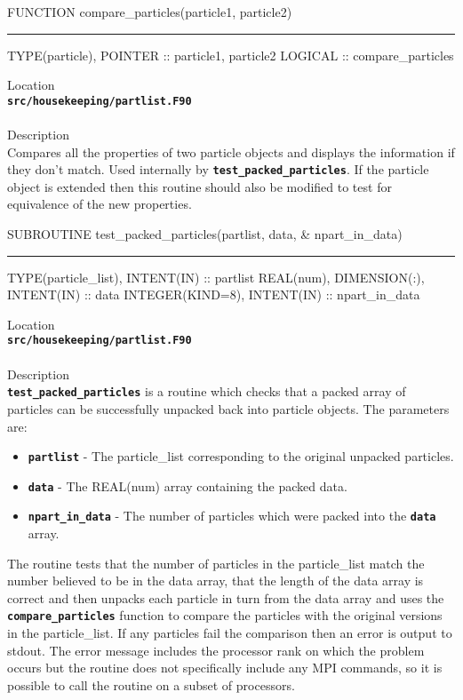 \documentclass[12pt,a4paper]{article}
\newcommand{\HRule}{\rule[0.3cm]{\linewidth}{0.5mm}}
\newcommand{\inlinecode}[1]{{\color{warwickred} \bf\texttt{#1}}}
\begin{document}
\begin{codedef}
FUNCTION compare_particles(particle1, particle2)
\HRule
TYPE(particle), POINTER :: particle1, particle2
LOGICAL :: compare_particles
\end{codedef}
\vspace{1cm}
{\Large Location\\}
\inlinecode{src/housekeeping/partlist.F90}\\
\\[0.5cm]
{\Large Description\\}
Compares all the properties of two particle objects and displays the
information if they don't match. Used internally by
\inlinecode{test\_packed\_particles}. If the particle object is extended then
this routine should also be modified to test for equivalence of the new
properties.
\\[0.5cm]

\begin{codedef}
SUBROUTINE test_packed_particles(partlist, data, &
    npart_in_data)
\HRule
TYPE(particle_list), INTENT(IN) :: partlist
REAL(num), DIMENSION(:), INTENT(IN) :: data
INTEGER(KIND=8), INTENT(IN) :: npart_in_data
\end{codedef}
\vspace{1cm}
{\Large Location\\}
\inlinecode{src/housekeeping/partlist.F90}\\
\\[0.5cm]
{\Large Description\\}
\inlinecode{test\_packed\_particles} is a routine which checks that a packed
array of particles can be successfully unpacked back into particle objects. The
parameters are:
\begin{itemize}
\item \inlinecode{partlist} - The particle\_list corresponding to the original
  unpacked particles.
\item \inlinecode{data} - The REAL(num) array containing the packed data.
\item \inlinecode{npart\_in\_data} - The number of particles which were packed
  into the \inlinecode{data} array.
\end{itemize}
The routine tests that the number of particles in the particle\_list match the
number believed to be in the data array, that the length of the data array is
correct and then unpacks each particle in turn from the data array and uses the
\inlinecode{compare\_particles} function to compare the particles with the
original versions in the particle\_list. If any particles fail the comparison
then an error is output to stdout. The error message includes the processor
rank on which the problem occurs but the routine does not specifically include
any MPI commands, so it is possible to call the routine on a subset of
processors.
\\[0.5cm]
\end{document}
